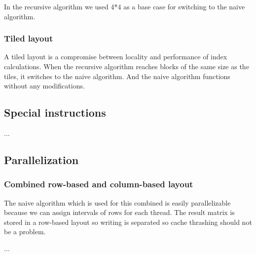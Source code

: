 In the recursive algorithm we used 4*4 as a base case for switching to the naive algorithm.


\subsubsection{Tiled layout}

A tiled layout is a compromise between locality and performance of index calculations. When the recursive algorithm reaches blocks of the same size as the tiles, it switches to the naive algorithm. And the naive algorithm functions without any modifications.

\subsection{Special instructions}

...

\subsection{Parallelization}

\subsubsection{Combined row-based and column-based layout}

The naive algorithm which is used for this combined is easily parallelizable because we can assign intervals of rows for each thread. The result matrix is stored in a row-based layout so writing is separated so cache thrashing should not be a problem.

...

